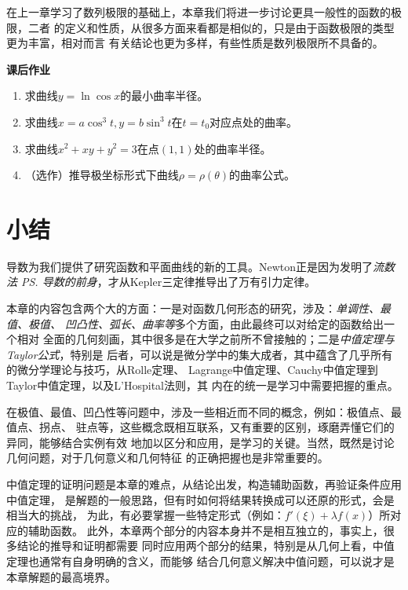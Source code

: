 在上一章学习了数列极限的基础上，本章我们将进一步讨论更具一般性的函数的极限，二者
的定义和性质，从很多方面来看都是相似的，只是由于函数极限的类型更为丰富，相对而言
有关结论也更为多样，有些性质是数列极限所不具备的。

\begin{ext}
	{\bf 课后作业}
	
	\begin{enumerate}
	  \item 求曲线$y=\ln\cos x$的最小曲率半径。
	  \item 求曲线$x=a\cos^3t,y=b\sin^3t$在$t=t_0$对应点处的曲率。
	  \item 求曲线$x^2+xy+y^2=3$在点$(1,1)$处的曲率半径。
	  \item （选作）推导极坐标形式下曲线$\rho=\rho(\theta)$的曲率公式。
	\end{enumerate}
\end{ext}

\section{小结}

导数为我们提供了研究函数和平面曲线的新的工具。Newton正是因为发明了{\it 流数法
\ps{导数的前身}}，才从Kepler三定律推导出了万有引力定律。

本章的内容包含两个大的方面：一是对函数几何形态的研究，涉及：{\it 单调性、最值、极值、
凹凸性、弧长、曲率等}多个方面，由此最终可以对给定的函数给出一个相对
全面的几何刻画，其中很多是在大学之前所不曾接触的；二是{\it 中值定理与Taylor公式}，特别是
后者，可以说是微分学中的集大成者，其中蕴含了几乎所有的微分学理论与技巧，从Rolle定理、
Lagrange中值定理、Cauchy中值定理到Taylor中值定理，以及L'Hospital法则，其
内在的统一是学习中需要把握的重点。

在极值、最值、凹凸性等问题中，涉及一些相近而不同的概念，例如：极值点、最值点、拐点、
驻点等，这些概念既相互联系，又有重要的区别，琢磨弄懂它们的异同，能够结合实例有效
地加以区分和应用，是学习的关键。当然，既然是讨论几何问题，对于几何意义和几何特征
的正确把握也是非常重要的。

中值定理的证明问题是本章的难点，从结论出发，构造辅助函数，再验证条件应用中值定理，
是解题的一般思路，但有时如何将结果转换成可以还原的形式，会是相当大的挑战，
为此，有必要掌握一些特定形式（例如：$f'(\xi)+\lambda f(x)$）所对应的辅助函数。
此外，本章两个部分的内容本身并不是相互独立的，事实上，很多结论的推导和证明都需要
同时应用两个部分的结果，特别是从几何上看，中值定理也通常有自身明确的含义，而能够
结合几何意义解决中值问题，可以说才是本章解题的最高境界。

